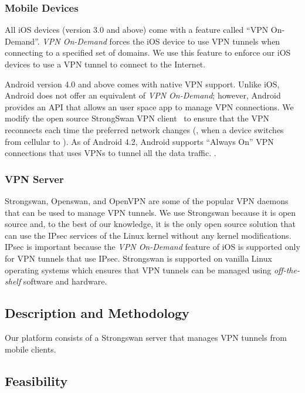 \subsubsection{Mobile Devices}

All iOS devices (version 3.0 and above) come with a feature called ``VPN
On-Demand''. \emph{VPN On-Demand} forces the iOS device to use VPN tunnels
when connecting to a specified set of domains. We use this feature to
enforce our iOS devices to use a VPN tunnel to connect to the Internet.

Android version 4.0 and above comes with native VPN support. Unlike iOS,
Android does not offer an equivalent of \emph{VPN On-Demand}; however,
Android provides an API that allows an user space app to manage VPN
connections. We modify the open source StrongSwan VPN
client~\cite{strongswanclient} to ensure that the VPN reconnects each time
the preferred network changes (\eg, when a device switches from cellular to
\wifi). As of Android 4.2, Android supports ``Always On'' VPN connections
that uses VPNs to tunnel all the data traffic. .

\subsubsection{VPN Server}
Strongswan, Openswan, and OpenVPN are some of the popular VPN daemons that
can be used to manage VPN tunnels. We use Strongswan because it
is open source and, to the best of our knowledge, it is the only open
source solution that can use the IPsec services of the Linux kernel without
any kernel modifications. IPsec is important because the \emph{VPN
On-Demand} feature of iOS is supported only for VPN tunnels that use IPsec.
Strongswan is supported on vanilla Linux operating systems which ensures
that VPN tunnels can be managed using \emph{off-the-shelf} software and
hardware.

\subsection{Description and Methodology}

Our platform consists of a Strongswan server that manages VPN tunnels from mobile clients. 

\subsection{Feasibility}

